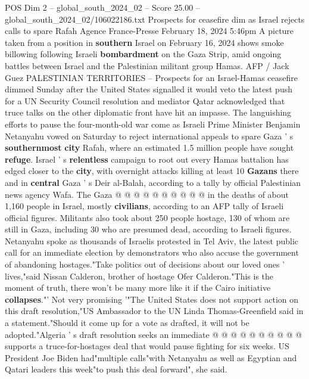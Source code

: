 \begin{textsample}{POS Dim 2 – global\_south\_2024\_02 – Score 25.00 – global\_south\_2024\_02/106022186.txt}  \label{ex:f2_pos_038}
Prospects for ceasefire dim as Israel rejects calls to spare Rafah Agence France-Presse February 18, 2024 5:46pm A picture taken from a position in \textbf{southern} Israel on February 16, 2024 shows smoke billowing following Israeli \textbf{bombardment} on the Gaza Strip, amid ongoing battles between Israel and the Palestinian militant group Hamas.
AFP / Jack Guez PALESTINIAN TERRITORIES -- Prospects for an Israel-Hamas ceasefire dimmed Sunday after the United States signalled it would veto the latest push for a UN Security Council resolution and mediator Qatar acknowledged that truce talks on the other diplomatic front have hit an impasse.
The languishing efforts to pause the four-month-old war come as Israeli Prime Minister Benjamin Netanyahu vowed on Saturday to reject international appeals to spare Gaza ' s \textbf{southernmost} \textbf{city} Rafah, where an estimated 1.5 million people have sought \textbf{refuge}.
Israel ' s \textbf{relentless} campaign to root out every Hamas battalion has edged closer to the \textbf{city}, with overnight attacks killing at least 10 \textbf{Gazans} there and in \textbf{central} Gaza ' s Deir al-Balah, according to a tally by official Palestinian news agency Wafa.
The Gaza @ @ @ @ @ @ @ @ @ @ in the deaths of about 1,160 people in Israel, mostly \textbf{civilians}, according to an AFP tally of Israeli official figures.
Militants also took about 250 people hostage, 130 of whom are still in Gaza, including 30 who are presumed dead, according to Israeli figures.
Netanyahu spoke as thousands of Israelis protested in Tel Aviv, the latest public call for an immediate election by demonstrators who also accuse the government of abandoning hostages."Take politics out of decisions about our loved ones ' lives,"said Nissan Calderon, brother of hostage Ofer Calderon."This is the moment of truth, there won't be many more like it if the Cairo initiative \textbf{collapses}."' Not very promising '"The United States does not support action on this draft resolution,"US Ambassador to the UN Linda Thomas-Greenfield said in a statement."Should it come up for a vote as drafted, it will not be adopted."Algeria ' s draft resolution seeks an immediate @ @ @ @ @ @ @ @ @ @ supports a truce-for-hostages deal that would pause fighting for six weeks.
US President Joe Biden had"multiple calls"with Netanyahu as well as Egyptian and Qatari leaders this week"to push this deal forward", she said.

\end{textsample}

